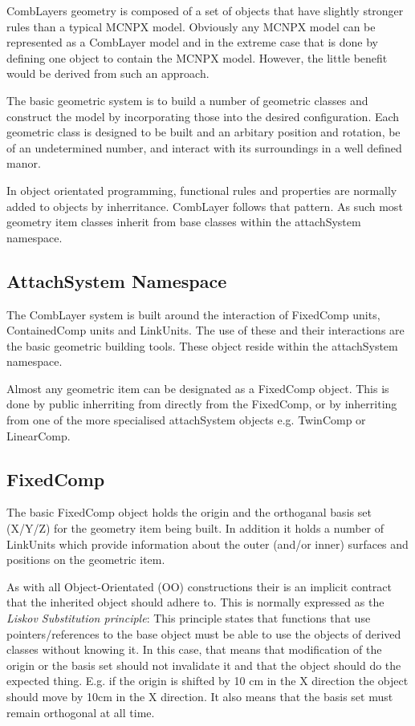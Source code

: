CombLayers geometry is composed of a set of objects that have slightly
stronger rules than a typical MCNPX model. Obviously any MCNPX model
can be represented as a CombLayer model and in the extreme case that
is done by defining one object to contain the MCNPX model. However, the
little benefit would be derived from such an approach.

The basic geometric system is to build a number of geometric classes
and construct the model by incorporating those into the desired
configuration. Each geometric class is designed to be built and an
arbitary position and rotation, be of an undetermined number, and
interact with its surroundings in a well defined manor. 

In object orientated programming, functional rules and properties are
normally added to objects by inherritance. CombLayer follows that
pattern. As such most geometry item classes inherit from base classes within 
the attachSystem namespace.

\subsection{AttachSystem Namespace}
\label{AttachSystem}

The CombLayer system is built around the interaction of FixedComp
units, ContainedComp units and LinkUnits. The use of these and their
interactions are the basic geometric building tools. These object
reside within the attachSystem namespace.

Almost any geometric item can be designated as a FixedComp
object. This is done by public inherriting from directly from the
FixedComp, or by inherriting from one of the more specialised attachSystem
objects e.g. TwinComp or LinearComp. 

\subsection{FixedComp}

The basic FixedComp object holds the origin and the orthoganal basis
set (X/Y/Z) for the geometry item being built. In addition it holds a 
number of LinkUnits which provide information about the outer (and/or inner)
surfaces and positions on the geometric item. 

As with all Object-Orientated (OO) constructions their is an implicit
contract that the inherited object should adhere to. This is normally
expressed as the {\it Liskov Substitution principle}: This principle
states that functions that use pointers/references to the base object
must be able to use the objects of derived classes without knowing
it. In this case, that means that modification of the origin or the
basis set should not invalidate it and that the object should do the
expected thing. E.g. if the origin is shifted by 10 cm in the X
direction the object should move by 10cm in the X direction. It also
means that the basis set must remain orthogonal at all time.

